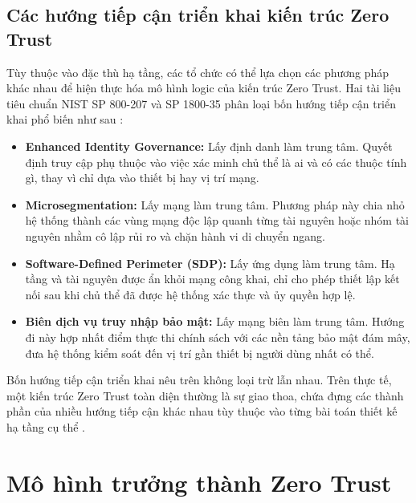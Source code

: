 \subsection{Các hướng tiếp cận triển khai kiến trúc Zero Trust}
\label{subsec:zta_deployment_models}

Tùy thuộc vào đặc thù hạ tầng, các tổ chức có thể lựa chọn các phương pháp khác nhau để hiện thực hóa mô hình logic của kiến trúc Zero Trust. Hai tài liệu tiêu chuẩn NIST SP 800-207 và SP 1800-35 phân loại bốn hướng tiếp cận triển khai phổ biến như sau \parencite{nist800207,nist_sp_1800_35}:

\begin{itemize}[itemsep=6pt, parsep=0pt]
    \item \textbf{Enhanced Identity Governance:} Lấy định danh làm trung tâm. Quyết định truy cập phụ thuộc vào việc xác minh chủ thể là ai và có các thuộc tính gì, thay vì chỉ dựa vào thiết bị hay vị trí mạng.
    
    \item \textbf{Microsegmentation:} Lấy mạng làm trung tâm. Phương pháp này chia nhỏ hệ thống thành các vùng mạng độc lập quanh từng tài nguyên hoặc nhóm tài nguyên nhằm cô lập rủi ro và chặn hành vi di chuyển ngang.
    
    \item \textbf{Software-Defined Perimeter (SDP):} Lấy ứng dụng làm trung tâm. Hạ tầng và tài nguyên được ẩn khỏi mạng công khai, chỉ cho phép thiết lập kết nối sau khi chủ thể đã được hệ thống xác thực và ủy quyền hợp lệ.
    
    \item \textbf{Biên dịch vụ truy nhập bảo mật:} Lấy mạng biên làm trung tâm. Hướng đi này hợp nhất điểm thực thi chính sách với các nền tảng bảo mật đám mây, đưa hệ thống kiểm soát đến vị trí gần thiết bị người dùng nhất có thể.
\end{itemize}

Bốn hướng tiếp cận triển khai nêu trên không loại trừ lẫn nhau. Trên thực tế, một kiến trúc Zero Trust toàn diện thường là sự giao thoa, chứa đựng các thành phần của nhiều hướng tiếp cận khác nhau tùy thuộc vào từng bài toán thiết kế hạ tầng cụ thể \parencite{nist800207}.


\section{Mô hình trưởng thành Zero Trust}

